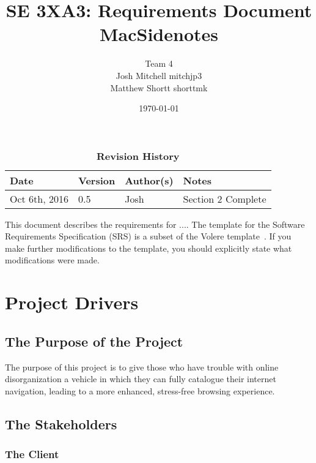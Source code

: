 \documentclass[12pt, titlepage]{article}
\title{SE 3XA3: Requirements Document\\MacSidenotes}
\author{Team 4
		\\ Josh Mitchell mitchjp3
		\\ Matthew Shortt shorttmk
}
\date{\today}
\begin{document}
\maketitle

\tableofcontents
\listoftables
\listoffigures



\begin{table}[bp]
\caption{\bf Revision History}
\begin{tabularx}{\textwidth}{p{3cm}p{2cm}p{2cm}X}
\toprule {\bf Date} & {\bf Version} & {\bf Author(s)} & {\bf Notes}\\
\midrule
Oct 6th, 2016 & 0.5 & Josh & Section 2 Complete\\
\bottomrule
\end{tabularx}
\end{table}

\newpage



This document describes the requirements for ....  The template for the Software
Requirements Specification (SRS) is a subset of the Volere
template~\citep{RobertsonAndRobertson2012}.  If you make further modifications
to the template, you should explicitly state what modifications were made.

\section{Project Drivers}

\subsection{The Purpose of the Project}

The purpose of this project is to give those who have trouble with online disorganization 
a vehicle in which they can fully catalogue their internet navigation, leading to a more 
enhanced, stress-free browsing experience. 

\subsection{The Stakeholders}

\subsubsection{The Client}
\end{document}
